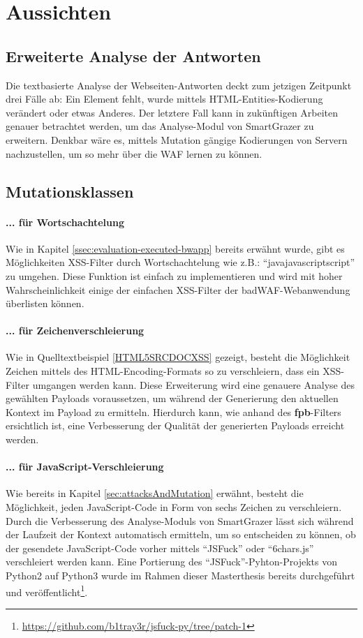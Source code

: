 \section{Aussichten}\label{sec:future}

\subsection{Erweiterte Analyse der Antworten}

Die textbasierte Analyse der Webseiten-Antworten deckt zum jetzigen Zeitpunkt drei Fälle ab: Ein Element fehlt, wurde mittels HTML-Entities-Kodierung verändert oder etwas Anderes. Der letztere Fall kann in zukünftigen Arbeiten genauer betrachtet werden, um das Analyse-Modul von SmartGrazer zu erweitern. Denkbar wäre es, mittels Mutation gängige Kodierungen von Servern nachzustellen, um so mehr über die WAF lernen zu können.

\subsection{Mutationsklassen}

\paragraph{... für Wortschachtelung}
Wie in Kapitel \ref{ssec:evaluation-executed-bwapp} bereits erwähnt wurde, gibt es Möglichkeiten XSS-Filter durch Wortschachtelung wie z.B.: ``javajavascriptscript'' zu umgehen. Diese Funktion ist einfach zu implementieren und wird mit hoher Wahrscheinlichkeit einige der einfachen XSS-Filter der badWAF-Webanwendung überlisten können.

\paragraph{... für Zeichenverschleierung}
Wie in Quelltextbeispiel \ref{HTML5SRCDOCXSS} gezeigt, besteht die Möglichkeit Zeichen mittels des HTML-Encoding-Formats so zu verschleiern, dass ein XSS-Filter umgangen werden kann. Diese Erweiterung wird eine genauere Analyse des gewählten Payloads voraussetzen, um während der Generierung den aktuellen Kontext im Payload zu ermitteln. Hierdurch kann, wie anhand des \textbf{fpb}-Filters ersichtlich ist, eine Verbesserung der Qualität der generierten Payloads erreicht werden.

\paragraph{... für JavaScript-Verschleierung}
Wie bereits in Kapitel \ref{sec:attacksAndMutation} erwähnt, besteht die Möglichkeit, jeden JavaScript-Code in Form von sechs Zeichen zu verschleiern. Durch die Verbesserung des Analyse-Moduls von SmartGrazer lässt sich während der Laufzeit der Kontext automatisch ermitteln, um so entscheiden zu können, ob der gesendete JavaScript-Code vorher mittels ``JSFuck'' oder ``6chars.js'' verschleiert werden kann. Eine Portierung des ``JSFuck''-Pyhton-Projekts von Python2 auf Python3 wurde im Rahmen dieser Masterthesis bereits durchgeführt und veröffentlicht\footnote{\url{https://github.com/b1tray3r/jsfuck-py/tree/patch-1}}.

